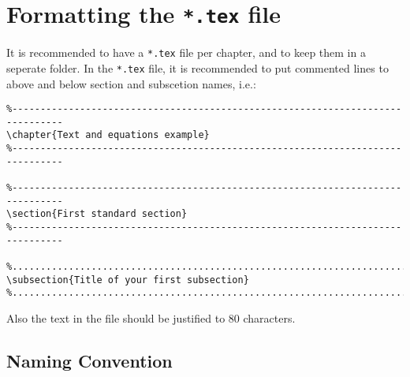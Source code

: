 \section{Formatting the \texorpdfstring{\texttt{*.tex}}{tex} file}

It is recommended to have a \texttt{*.tex} file per chapter, and to keep them
in a seperate folder. In the \texttt{*.tex} file, it is recommended to put
commented lines to above and below section and subscetion names, i.e.:

\begin{scriptsize}
\begin{verbatim}
%-------------------------------------------------------------------------------
\chapter{Text and equations example}
%-------------------------------------------------------------------------------

%-------------------------------------------------------------------------------
\section{First standard section}
%-------------------------------------------------------------------------------

%...............................................................................
\subsection{Title of your first subsection}
%...............................................................................
\end{verbatim}
\end{scriptsize}

Also the text in the file should be justified to 80 characters.

\subsection{Naming Convention}

